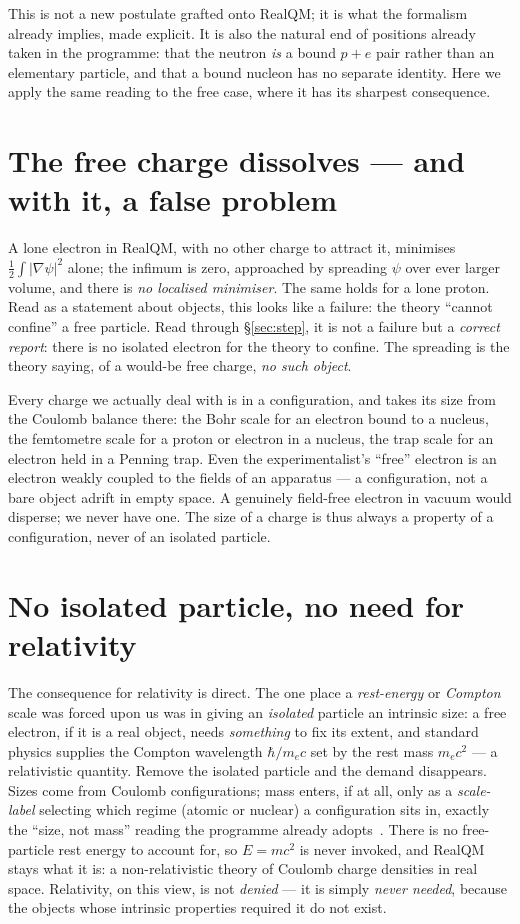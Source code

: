 \documentclass[11pt]{article}
\begin{document}
This is not a new postulate grafted onto RealQM; it is what the formalism already implies, made explicit.
It is also the natural end of positions already taken in the programme: that the neutron \emph{is} a bound
$p+e$ pair rather than an elementary particle, and that a bound nucleon has no separate identity. Here we
apply the same reading to the free case, where it has its sharpest consequence.

\section{The free charge dissolves --- and with it, a false problem}
\label{sec:free}

A lone electron in RealQM, with no other charge to attract it, minimises $\tfrac12\int|\nabla\psi|^2$
alone; the infimum is zero, approached by spreading $\psi$ over ever larger volume, and there is
\emph{no localised minimiser}. The same holds for a lone proton. Read as a statement about objects, this
looks like a failure: the theory ``cannot confine'' a free particle. Read through
\S\ref{sec:step}, it is not a failure but a \emph{correct report}: there is no isolated electron for the
theory to confine. The spreading is the theory saying, of a would-be free charge, \emph{no such object}.

Every charge we actually deal with is in a configuration, and takes its size from the Coulomb balance
there: the Bohr scale for an electron bound to a nucleus, the femtometre scale for a proton or electron in
a nucleus, the trap scale for an electron held in a Penning trap. Even the experimentalist's ``free''
electron is an electron weakly coupled to the fields of an apparatus --- a configuration, not a bare object
adrift in empty space. A genuinely field-free electron in vacuum would disperse; we never have one. The
size of a charge is thus always a property of a configuration, never of an isolated particle.

\section{No isolated particle, no need for relativity}
\label{sec:norel}

The consequence for relativity is direct. The one place a \emph{rest-energy} or \emph{Compton} scale was
forced upon us was in giving an \emph{isolated} particle an intrinsic size: a free electron, if it is a
real object, needs \emph{something} to fix its extent, and standard physics supplies the Compton
wavelength $\hbar/m_e c$ set by the rest mass $m_e c^2$ --- a relativistic quantity. Remove the isolated
particle and the demand disappears. Sizes come from Coulomb configurations; mass enters, if at all, only
as a \emph{scale-label} selecting which regime (atomic or nuclear) a configuration sits in, exactly the
``size, not mass'' reading the programme already adopts~\cite{RealNucleus}. There is no free-particle
rest energy to account for, so $E=mc^2$ is never invoked, and RealQM stays what it is: a non-relativistic
theory of Coulomb charge densities in real space. Relativity, on this view, is not \emph{denied} --- it is
simply \emph{never needed}, because the objects whose intrinsic properties required it do not exist.
\end{document}
